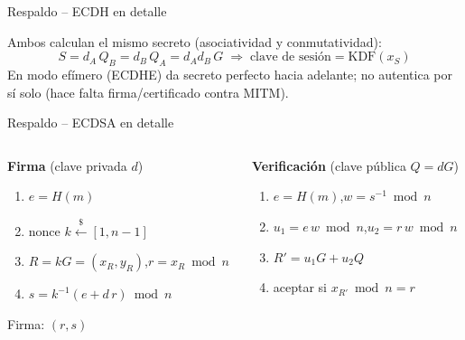 \documentclass[aspectratio=169,11pt]{beamer}
\begin{document}
\begin{frame}{Respaldo -- ECDH en detalle}
  \centering

  \vspace{0.8em}
  \small Ambos calculan el \alert{mismo secreto} (asociatividad y conmutatividad):
  \[ S = d_A\,Q_B = d_B\,Q_A = d_A d_B\,G \;\Longrightarrow\; \text{clave de sesión}=\mathrm{KDF}(x_S) \]
  \footnotesize En modo efímero (ECDHE) da \alert{secreto perfecto hacia adelante}; no
  autentica por sí solo (hace falta firma/certificado contra MITM).
\end{frame}

\begin{frame}{Respaldo -- ECDSA en detalle}
  \small
  \begin{columns}[t]
    \begin{column}{0.5\textwidth}
      \textbf{Firma}\; (clave privada $d$)
      \begin{enumerate}\footnotesize
        \item $e = H(m)$
        \item nonce $k \xleftarrow{\$} [1,n-1]$
        \item $R = kG=(x_R,y_R)$,\quad $r = x_R \bmod n$
        \item $s = k^{-1}(e + d\,r) \bmod n$
      \end{enumerate}
      Firma: $\boxed{(r,s)}$
    \end{column}
    \begin{column}{0.5\textwidth}
      \textbf{Verificación}\; (clave pública $Q=dG$)
      \begin{enumerate}\footnotesize
        \item $e=H(m)$,\quad $w = s^{-1}\bmod n$
        \item $u_1 = e\,w \bmod n$,\quad $u_2 = r\,w \bmod n$
        \item $R' = u_1 G + u_2 Q$
        \item aceptar si $x_{R'} \bmod n = r$
      \end{enumerate}
    \end{column}
  \end{columns}
\end{frame}
\end{document}
